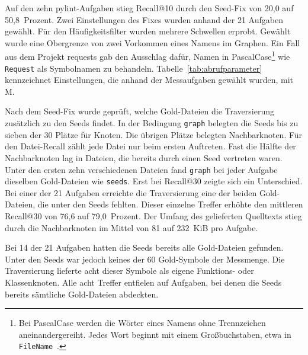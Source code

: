 Auf den zehn pylint-Aufgaben stieg Recall@10 durch den Seed-Fix von 20,0 auf 50,8~Prozent. Zwei Einstellungen des Fixes wurden anhand der 21 Aufgaben gewählt. Für den Häufigkeitsfilter wurden mehrere Schwellen erprobt. Gewählt wurde eine Obergrenze von zwei Vorkommen eines Namens im Graphen. Ein Fall aus dem Projekt requests gab den Ausschlag dafür, Namen in PascalCase\footnote{Bei PascalCase werden die Wörter eines Namens ohne Trennzeichen aneinandergereiht. Jedes Wort beginnt mit einem Großbuchstaben, etwa in \texttt{FileName}~\parencite{microsoft2023capitalization}.} wie \texttt{Request} als Symbolnamen zu behandeln. Tabelle~\ref{tab:abrufparameter} kennzeichnet Einstellungen, die anhand der Messaufgaben gewählt wurden, mit M.


Nach dem Seed-Fix wurde geprüft, welche Gold-Dateien die Traversierung zusätzlich zu den Seeds findet. In der Bedingung \texttt{graph} belegten die Seeds bis zu sieben der 30 Plätze für Knoten. Die übrigen Plätze belegten Nachbarknoten. Für den Datei-Recall zählt jede Datei nur beim ersten Auftreten. Fast die Hälfte der Nachbarknoten lag in Dateien, die bereits durch einen Seed vertreten waren. Unter den ersten zehn verschiedenen Dateien fand \texttt{graph} bei jeder Aufgabe dieselben Gold-Dateien wie \texttt{seeds}. Erst bei Recall@30 zeigte sich ein Unterschied. Bei einer der 21 Aufgaben erreichte die Traversierung eine der beiden Gold-Dateien, die unter den Seeds fehlten. Dieser einzelne Treffer erhöhte den mittleren Recall@30 von 76,6 auf 79,0~Prozent. Der Umfang des gelieferten Quelltexts stieg durch die Nachbarknoten im Mittel von 81 auf 232~KiB pro Aufgabe.

Bei 14 der 21 Aufgaben hatten die Seeds bereits alle Gold-Dateien gefunden. Unter den Seeds war jedoch keines der 60 Gold-Symbole der Messmenge. Die Traversierung lieferte acht dieser Symbole als eigene Funktions- oder Klassenknoten. Alle acht Treffer entfielen auf Aufgaben, bei denen die Seeds bereits sämtliche Gold-Dateien abdeckten.


